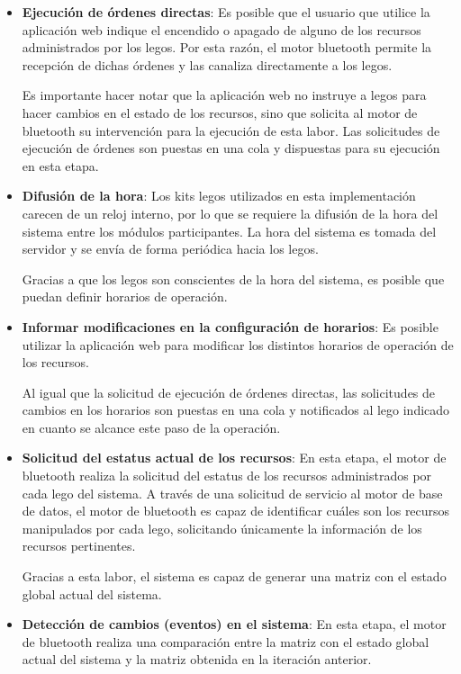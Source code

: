\documentclass[12pt]{article}
\begin{document}
\begin{itemize}
	\item \textbf{Ejecución de órdenes directas}: Es posible que el usuario que utilice la aplicación web indique el encendido o apagado de alguno de los recursos administrados por los legos.
	Por esta razón, el motor bluetooth permite la recepción de dichas órdenes y las canaliza directamente a los legos.

	Es importante hacer notar que la aplicación web no instruye a legos para hacer cambios en el estado de los recursos, sino que solicita al motor de bluetooth su intervención para la ejecución de esta labor.
	Las solicitudes de ejecución de órdenes son puestas en una cola y dispuestas para su ejecución en esta etapa.

	\item \textbf{Difusión de la hora}: Los kits legos utilizados en esta implementación carecen de un reloj interno, por lo que se requiere la difusión de la hora del sistema entre los módulos participantes.
	La hora del sistema es tomada del servidor y se envía de forma periódica hacia los legos.

	Gracias a que los legos son conscientes de la hora del sistema, es posible que puedan definir horarios de operación.

	\item \textbf{Informar modificaciones en la configuración de  horarios}: Es posible utilizar la aplicación web para modificar los distintos horarios de operación de los recursos. 

	Al igual que la solicitud de ejecución de órdenes directas, las solicitudes de cambios en los horarios son puestas en una cola y notificados al lego indicado en cuanto se alcance este paso de la operación.

	\item \textbf{Solicitud del estatus actual de los recursos}: En esta etapa, el motor de bluetooth realiza la solicitud del estatus de los recursos administrados por cada lego del sistema.
	A través de una solicitud de servicio al motor de base de datos, el motor de bluetooth es capaz de identificar cuáles son los recursos manipulados por cada lego, solicitando únicamente la información de los recursos pertinentes. 

	Gracias a esta labor, el sistema es capaz de generar una matriz con el estado global actual del sistema.

	\item \textbf{Detección de cambios (eventos) en el sistema}: En esta etapa, el motor de bluetooth realiza una comparación entre la matriz con el estado global actual del sistema y la matriz obtenida en la iteración anterior.


\end{itemize}
\end{document}
